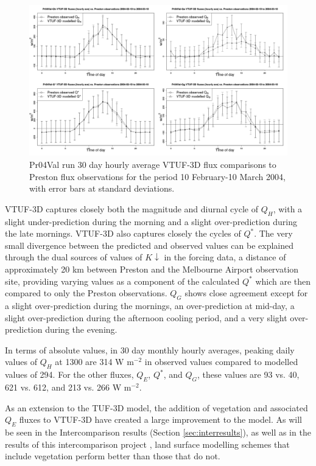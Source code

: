 \documentclass[final,3p,times,authoryear]{elsarticle}
\begin{document}
\begin{figure}[!htbp] 
\includegraphics[trim = 0mm 0mm 0mm 0mm, clip, scale=0.30]{images/Pr04Val-EnergyBalanceOverallAve4Plots_.png}
\caption{Pr04Val run 30 day hourly average VTUF-3D flux comparisons to Preston flux observations for the period 10 February-10 March 2004, with error bars at standard deviations. \label{fig:Preston30Day4} }     
\end{figure}



VTUF-3D captures closely both the magnitude and diurnal cycle of $Q_{H}$, with a slight under-prediction during the morning and a slight over-prediction during the late mornings. VTUF-3D also captures closely the cycles of $Q^{*}$. The very small divergence between the predicted and observed values can be explained through the dual sources of values of $K\downarrow$ in the forcing data, a distance of approximately 20 km between Preston and the Melbourne Airport observation site, providing varying values as a component of the calculated $Q^{*}$ which are then compared to only the Preston observations. $Q_{G}$ shows close agreement except for a slight over-prediction during the mornings, an over-prediction at mid-day, a slight over-prediction during the afternoon cooling period, and a very slight over-prediction during the evening.

In terms of absolute values, in 30 day monthly hourly averages, peaking daily values of $Q_{H}$ at 1300 are 314 W m$^{-2}$ in observed values compared to modelled values of 294. For the other fluxes, $Q_{E}$, $Q^{*}$, and $Q_{G}$, these values are 93 vs. 40, 621 vs. 612, and 213 vs. 266 W m$^{-2}$.

As an extension to the TUF-3D model, the addition of vegetation and associated $Q_{E}$ fluxes to VTUF-3D have created a large improvement to the model. As will be seen in the Intercomparison results (Section \ref{sec:interresults}), as well as in the results of this intercomparison project \citep{Grimmond2011,Best2012}, land surface modelling schemes that include vegetation perform better than those that do not. 
\end{document}
